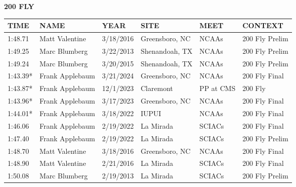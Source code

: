 \begin{minipage}[t]{0.48\textwidth}
\centering
\textbf{200 FLY}\\[0.05cm]
\begin{tabular}{@{}p{1.8cm}p{2.8cm}p{1.2cm}p{1.4cm}p{1.4cm}p{2.0cm}@{}}
\hline
\textbf{TIME} & \textbf{NAME} & \textbf{YEAR} & \textbf{SITE} & \textbf{MEET} & \textbf{CONTEXT} \\
\hline
1:48.71 & Matt Valentine & 3/18/2016 & Greensboro, NC & NCAAs & 200 Fly Prelim \\
1:49.25 & Marc Blumberg & 3/22/2013 & Shenandoah, TX & NCAAs & 200 Fly Prelim \\
1:49.24 & Marc Blumberg & 3/20/2015 & Shenandoah, TX & NCAAs & 200 Fly Prelim \\
1:43.39* & Frank Applebaum & 3/21/2024 & Greensboro, NC & NCAAs & 200 Fly Final \\
1:43.87* & Frank Applebaum & 12/1/2023 & Claremont & PP at CMS & 200 Fly \\
1:43.96* & Frank Applebaum & 3/17/2023 & Greensboro, NC & NCAAs & 200 Fly Final \\
1:44.01* & Frank Applebaum & 3/18/2022 & IUPUI & NCAAs & 200 Fly Final \\
1:46.06 & Frank Applebaum & 2/19/2022 & La Mirada & SCIACs & 200 Fly Final \\
1:47.40 & Frank Applebaum & 2/19/2022 & La Mirada & SCIACs & 200 Fly Prelim \\
1:48.70 & Matt Valentine & 3/18/2016 & Greensboro, NC & NCAAs & 200 Fly Final \\
1:48.90 & Matt Valentine & 2/21/2016 & La Mirada & SCIACs & 200 Fly Final \\
1:50.08 & Marc Blumberg & 2/19/2013 & La Mirada & SCIACs & 200 Fly Prelim \\
\hline
\end{tabular}
\end{minipage}

\vspace{0.4cm}


